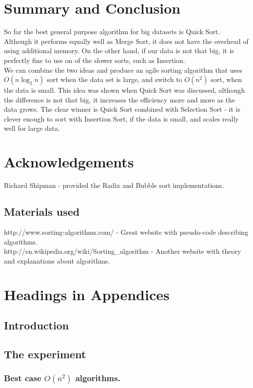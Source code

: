\documentclass{acm_proc_article-sp}
\begin{document}
\section{Summary and Conclusion}
So far the best general purpose algorithm for big datasets is Quick Sort. Although it performs equally well as Merge Sort, it does not have the overhead of using additional memory. On the other hand, if our data is not that big, it is perfectly fine to use on of the slower sorts, such as Insertion. \\
We can combine the two ideas and produce an agile sorting algorithm that uses $O(n \log_2 n)$ sort when the data set is large, and switch to $O(n^2)$ sort, when the data is small. This idea was shown when Quick Sort was discussed, although the difference is not that big, it increases the efficiency more and more as the data grows. The clear winner is Quick Sort combined with Selection Sort - it is clever enough to sort with Insertion Sort, if the data is small, and scales really well for large data.


 
\appendix
\section{Acknowledgements}
Richard Shipman - provided the Radix and Bubble sort implementations.
\subsection{Materials used}
http://www.sorting-algorithms.com/ - Great website with pseudo-code describing algorithms. \\
http://en.wikipedia.org/wiki/Sorting\_algorithm  - Another website with theory and explanations about algorithms. \\
\section{Headings in Appendices}
\subsection{Introduction}
\subsection{The experiment}
\subsubsection{Best case $O(n^2)$ algorithms.}
\end{document}
